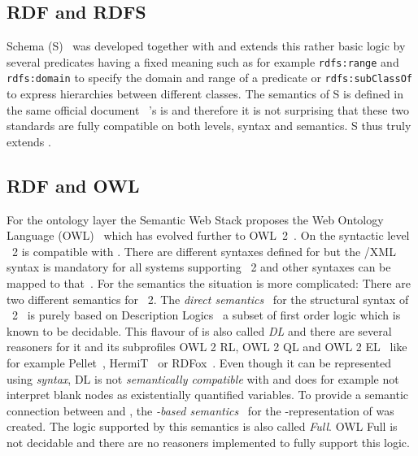 \subsection{RDF and RDFS}
\rdf Schema (\rdf{}S)~\cite{RDFS} was developed together with \rdf and extends this rather basic logic by several predicates having a fixed meaning such as for example 
\texttt{rdfs:range} and \texttt{rdfs:domain} to specify the domain and range of a predicate or \texttt{rdfs:subClassOf} to express hierarchies between different classes.
The semantics of \rdf{}S is defined in the same official document~\cite{RDFSemantics} \rdf's is and therefore it is not surprising that these two standards are fully compatible
on both levels, syntax and semantics. 
\rdf{}S thus truly extends \rdf. 

\subsection{RDF and OWL}
For the ontology layer the Semantic Web Stack proposes the Web Ontology Language (OWL)~\cite{owlold} which has evolved further to \linebreak OWL~2~\cite{owl}. 
On the syntactic level \owl~2 is compatible with \rdf. There are different syntaxes defined for \owl but the \rdf{}/XML syntax is mandatory for all 
systems supporting \owl~2 and other 
syntaxes can be mapped to that~\cite{owltordf}.
For the semantics the situation is more complicated: There are two different semantics for \owl~2. 
The \emph{direct semantics}~\cite{owldsem} for the structural syntax of \owl~2~\cite{owlsyn1} is purely based on Description Logics~\cite{dl} a subset of first order logic
which is known 
to be decidable.
This flavour of  is also called \emph{\owl DL} and there are several reasoners for it and its subprofiles OWL 2 RL, OWL 2 QL and OWL 2 EL~\cite{OWLRL}
like for example Pellet~\cite{Pellet}, HermiT~\cite{hermit} or RDFox~\cite{rdfox}.  
Even though it can be represented using \rdf \emph{syntax}, \owl DL is not \emph{semantically compatible} with \rdf and 
does for example not interpret blank nodes as existentially quantified variables.
To provide a semantic connection between \owl and \rdf, 
the \emph{\rdf-based semantics}~\cite{owlrdfsem} for the \rdf-representation of  was created. %
The logic supported by this semantics is also called \emph{\owl Full}. OWL Full is not decidable and there are no reasoners implemented to fully support 
this logic. 


